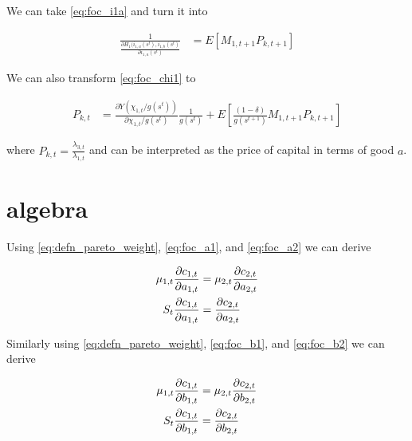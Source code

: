 \documentclass[19pt]{article}
\newcommand{\fracpd}[2]{
  \ensuremath{\frac{\partial #1}{\partial #2}}
}
\begin{document}
  We can take \eqref{eq:foc_i1a} and turn it into

  \begin{align*}
    \frac{1}{\fracpd{H_1(i_{1, a}(s^t), i_{1, b}(s^t)}{i_{1, a}(s^t)}} &= E \left[ M_{1, t+1} P_{k, t+1} \right]
  \end{align*}

  We can also transform \eqref{eq:foc_chi1} to

  \begin{align*}
    P_{k, t} &= \fracpd{Y(\chi_{1, t} / g(s^t))}{\chi_{1, t} / g(s^t)} \frac{1}{g(s^t)} + E \left[ \frac{(1 - \delta)}{g(s^{t+1})} M_{1, t+1} P_{k, t+1} \right]
  \end{align*}

  where $P_{k, t} = \frac{\lambda_{3, t}}{\lambda_{1, t}}$ and can be interpreted as the price of capital in terms of good $a$.

  \section{algebra}

  Using \eqref{eq:defn_pareto_weight}, \eqref{eq:foc_a1}, and \eqref{eq:foc_a2} we can derive

  \begin{align} \label{eq:eqn_for_a}
    \mu_{1,t} \fracpd{c_{1,t}}{a_{1,t}} &= \mu_{2,t} \fracpd{c_{2,t}}{a_{2,t}} \notag \\
    S_{t} \fracpd{c_{1,t}}{a_{1,t}} &= \fracpd{c_{2,t}}{a_{2,t}}
  \end{align}

  Similarly using \eqref{eq:defn_pareto_weight}, \eqref{eq:foc_b1}, and \eqref{eq:foc_b2} we can derive

  \begin{align} \label{eq:eqn_for_b}
    \mu_{1,t} \fracpd{c_{1,t}}{b_{1,t}} &= \mu_{2,t} \fracpd{c_{2,t}}{b_{2,t}} \notag \\
    S_{t} \fracpd{c_{1,t}}{b_{1,t}} &= \fracpd{c_{2,t}}{b_{2,t}}
  \end{align}
\end{document}
